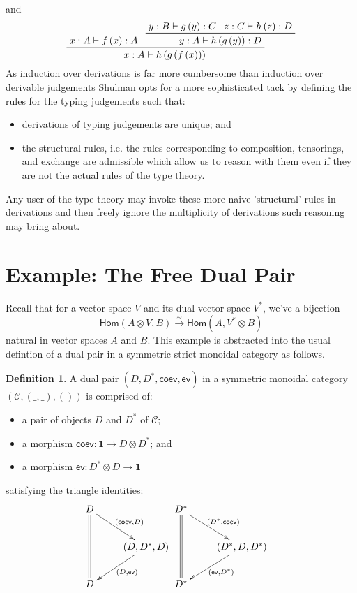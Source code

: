 \documentclass[pra,floatfix,
amsmath,superscriptaddress, 12pt]{article}
\theoremstyle{definition}
\newtheorem{defn}[thm]{Definition}
\newcommand{\liso}{\overset{\sim}{\longrightarrow}}
\newcommand{\evmap}{\mathsf{ev}}
\newcommand{\coev}{\mathsf{coev}}
\begin{document}
and
\[
\prftree{x:A\vdash f\left(x\right):A}{\prftree{y:B\vdash g\left(y\right):C}{z:C\vdash h\left(z\right):D}{y:A\vdash h\left(g\left(y\right)\right):D}}{x:A\vdash h\left(g\left(f\left(x\right)\right)\right)}
\]
As induction over derivations is far more cumbersome than induction
over derivable judgements Shulman opts for a more sophisticated tack by defining the rules for the typing judgements such that:
\begin{itemize}
\item derivations of typing judgements are unique; and
\item the structural rules, i.e. the rules corresponding to composition,
tensorings, and exchange are admissible which allow us to reason with them even if they are not the actual rules of the type theory. %
\end{itemize}
Any user of the
type theory may invoke these more naive 'structural' rules in derivations
and then freely ignore the multiplicity of derivations such reasoning
may bring about. 

\section{Example: The Free Dual Pair}

Recall that for a vector space $V$ and its dual vector space $V^{*}$,
we've a bijection 
\[
\mathsf{Hom}\left(A\otimes V,B\right)\liso\mathsf{Hom}\left(A,V^{*}\otimes B\right)
\]
 natural in vector spaces $A$ and $B$. This example is abstracted
into the usual defintion of a dual pair in a symmetric strict monoidal
category as follows.
\begin{defn}
A dual pair $\left(D,D^{*},\coev,\evmap\right)$ in a symmetric monoidal
category $\left(\mathcal{C},\left(\_,\_\right),\left(\right)\right)$
is comprised of:
\begin{itemize}
\item a pair of objects $D$ and $D^{*}$ of $\mathcal{C}$;
\item a morphism $\coev:\mathbf{1}\longrightarrow D\otimes D^{*}$; and
\item a morphism $\evmap:D^{*}\otimes D\longrightarrow\mathbf{1}$
\end{itemize}
satisfying the triangle identities:
\[
\begin{split}\vcenter{\vbox{\xymatrix{D\ar@{=}[dd]\ar[dr]^{\left(\coev,D\right)}\\
 & \left(D,D^{*},D\right)\ar[dl]^{\left(D,\evmap\right)}\\
D
}
}} & \vcenter{\vbox{\xymatrix{D^{*}\ar@{=}[dd]\ar[dr]^{\left(D^{*},\coev\right)}\\
 & \left(D^{*},D,D^{*}\right)\ar[dl]^{\left(\evmap,D^{*}\right)}\\
D^{*}
}
}}\end{split}
\]
\end{defn}
\end{document}
